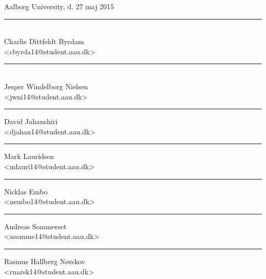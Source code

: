 \vspace{\baselineskip}\hfill Aalborg University, d. 27 maj 2015
\vfill\noindent
\begin{minipage}[b]{0.45\textwidth}
 \centering
 \rule{\textwidth}{0.5pt}\\
  Charlie Dittfeldt Byrdam\\
 {\footnotesize <cbyrda14@student.aau.dk>}
\end{minipage}
\hfill
\vspace{3\baselineskip}
\begin{minipage}[b]{0.45\textwidth}
 \centering
 \rule{\textwidth}{0.5pt}\\
  Jesper Windelborg Nielsen\\
 {\footnotesize <jwni14@student.aau.dk>}
\end{minipage}
\hfill
\vspace{3\baselineskip}

\begin{minipage}[b]{0.45\textwidth}
 \centering
 \rule{\textwidth}{0.5pt}
  David Jahanshiri\\
 {\footnotesize <djahan14@student.aau.dk>}
\end{minipage}

\begin{minipage}[b]{0.45\textwidth}
 \centering
 \rule{\textwidth}{0.5pt}
  Mark Lauridsen\\
 {\footnotesize <mlauri14@student.aau.dk>}
\end{minipage}
\begin{minipage}[b]{0.45\textwidth}
 \centering
 \rule{\textwidth}{0.5pt}
  Nicklas Embo\\
 {\footnotesize <nembo14@student.aau.dk>}
\end{minipage}
\begin{minipage}[b]{0.45\textwidth}
 \centering
 \rule{\textwidth}{0.5pt}
  Andreas Sommerset\\
 {\footnotesize <asomme14@student.aau.dk>}
\end{minipage}
\begin{minipage}[b]{0.45\textwidth}
 \centering
 \rule{\textwidth}{0.5pt}
  Rasmus Hallberg Nørskov\\
 {\footnotesize <rnarsk14@student.aau.dk>}
\end{minipage}